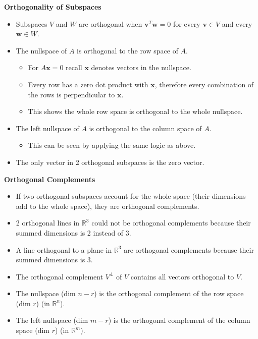 \documentclass[11pt]{article}
\begin{document}
\textbf{Orthogonality of Subspaces}
\begin{itemize}
    \item Subspaces $V$ and $W$ are orthogonal when $\boldsymbol{v}^T\boldsymbol{w}=0$ for 
    every $\boldsymbol{v} \in V$ and every $\boldsymbol{w} \in W$.
    \item The nullspace of $A$ is orthogonal to the row space of $A$.
    \begin{itemize}
        \item For $A\boldsymbol{x}=0$ recall $\boldsymbol{x}$ denotes vectors in the nullspace.
        \item Every row has a zero dot product with $\boldsymbol{x}$, therefore every 
        combination of the rows is perpendicular to $\boldsymbol{x}$.
        \item This shows the whole row space is orthogonal to the whole nullspace.
    \end{itemize}
    \item The left nullspace of $A$ is orthogonal to the column space of $A$.
    \begin{itemize}
        \item This can be seen by applying the same logic as above.
    \end{itemize}
    \item The only vector in 2 orthogonal subspaces is the zero vector. 
\end{itemize}

\textbf{Orthogonal Complements}
\begin{itemize}
    \item If two orthogonal subspaces account for the whole space (their dimensions add to the 
    whole space), they are orthogonal complements.
    \item 2 orthogonal lines in $\mathbb{R}^3$ could not be orthogonal complements because 
    their summed dimensions is 2 instead of 3.
    \item A line orthogonal to a plane in $\mathbb{R}^3$ are orthogonal complements because 
    their summed dimensions is 3.
    \item The orthogonal complement $V^\perp$ of $V$ contains all vectors orthogonal to $V$.
    \item The nullspace (dim $n-r$) is the orthogonal complement of the row space (dim $r$) (in 
    $\mathbb{R}^n$).
    \item The left nullspace (dim $m-r$) is the orthogonal complement of the column space (dim 
    $r$) (in $\mathbb{R}^m$).
\end{itemize}
\end{document}
